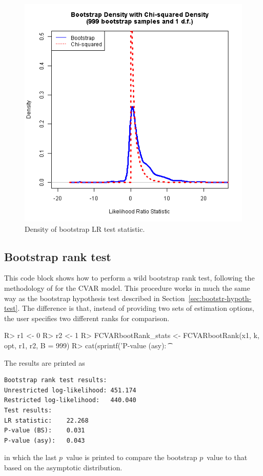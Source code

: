 \documentclass[article]{jss}
\begin{document}
\begin{figure}[tbh]
  \centering
  \includegraphics[scale = 1, keepaspectratio=true]{Figures/LRdensity_bw045.png}
  \caption{Density of bootstrap LR test statistic.}
  \label{fig:BS}
\end{figure}



\subsection{Bootstrap rank test}
\label{sec:bootstrap-rank-test}

This code block
shows how to perform a wild bootstrap rank test, following the methodology of \cite{Cavaliere2010} for the CVAR model. This procedure works in much the same way as the bootstrap hypothesis test described in Section~\ref{sec:bootstr-hypoth-test}. The difference is that, instead of providing two sets of estimation options, the user specifies two different ranks for comparison.

\begin{Code}
R> r1 <- 0
R> r2 <- 1
R> FCVARbootRank_stats <- FCVARbootRank(x1, k, opt, r1, r2, B = 999)
R> cat(sprintf('P-value (asy): \t %
\end{Code}

The results are printed as
\begin{verbatim}
Bootstrap rank test results:
Unrestricted log-likelihood: 451.174
Restricted log-likelihood:   440.040
Test results:
LR statistic: 	 22.268
P-value (BS): 	 0.031
P-value (asy): 	 0.043
\end{verbatim}
in which the last $p$~value is printed to compare the bootstrap $p$~value to that based on the asymptotic distribution. 
\end{document}
